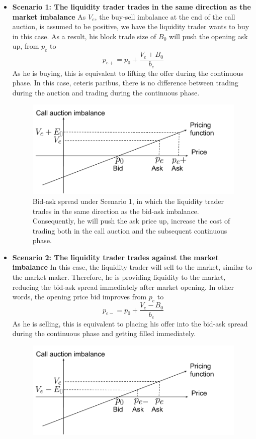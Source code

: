 \documentclass{article}
\begin{document}
\begin{itemize}
  \item {\textbf{Scenario 1: The liquidity trader trades in the same direction as the market imbalance}
        As $V_e$, the buy-sell imbalance at the end of the call auction, is assumed to be positive, we have the liquidity trader wants to buy in this case. As a result, his block trade size of $B_0$ will push the opening ask up, from $p_e$ to
        \[
          p_{e+} =  p_0 + \frac{V_e + B_0}{b_e}
        \]
        As he is buying, this is equivalent to lifting the offer during the continuous phase. In this case, ceteris paribus, there is no difference between trading during the auction and trading during the continuous phase.

        \begin{figure}[h]
          \includegraphics[width=\textwidth]{MMPricingTransitionSameDir}
          \caption{Bid-ask spread under Scenario 1, in which the liquidity trader trades in the same direction as the bid-ask imbalance. Consequently, he will push the ask price up, increase the cost of trading both in the call auction and the subsequent continuous phase.}
          \label{fig:mm_pricing_transition_s1}
        \end{figure}
        }
  \item {
        \textbf{Scenario 2: The liquidity trader trades against the market imbalance}
        In this case, the liquidity trader will sell to the market, similar to the market maker. Therefore, he is providing liquidity to the market, reducing the bid-ask spread immediately after market opening. In other words, the opening price bid improves from $p_e$ to
        \[
          p_{e-} = p_0 + \frac{V_e - B_0}{b_e}
        \]
        As he is selling, this is equivalent to placing his offer into the bid-ask spread during the continuous phase and getting filled immediately.
        \begin{figure}[h]
          \includegraphics[width=\textwidth]{MMPricingTransitionDifferentDir}

\end{figure}}
\end{itemize}
\end{document}
